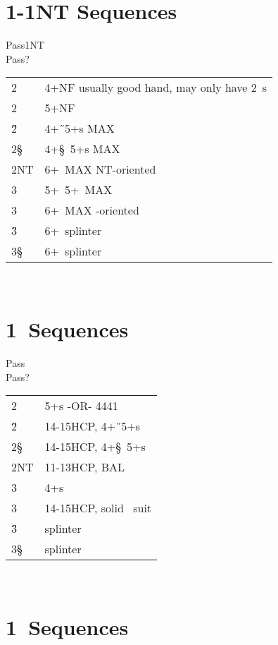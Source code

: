 \section{1\D-1NT Sequences}

\begin{bidding}
\>\D\>Pass\>1NT\\
\>Pass\>?\\
\end{bidding}

\begin{xtabular}{ll}
2\C &4+\C NF usually good hand, may only have 2\D\ s \\
2\D &5+\D NF\\
2\H &4+\H\ 5+\D s MAX\\
2\S &4+\S\ 5+\D s MAX\\
2NT &6+\D\ MAX NT-oriented \\
3\C &5+\C\ 5+\D\ MAX \\
3\D &6+\D\ MAX \D-oriented \\
3\H &6+\D\ splinter\\
3\S &6+\D\ splinter\\
\end{xtabular}\\

\section{1\C\ Sequences}

\begin{bidding}
\>\D\>Pass\C\\
\>Pass\>?\\
\end{bidding}

\begin{xtabular}{ll}
2\D &5+\D s -OR- 4441\\
2\H &14-15HCP, 4+\H\ 5+\D s \\
2\S &14-15HCP, 4+\S\ 5+\D s \\
2NT &11-13HCP, BAL \\
3\C &4+\C s \\
3\D &14-15HCP, solid \D\ suit \\
3\H &splinter\\
3\S &splinter\\
\end{xtabular}\\

\section{1\D\ Sequences}

